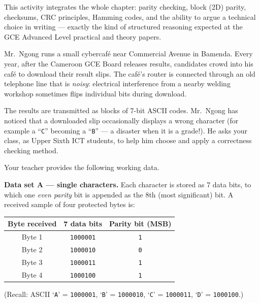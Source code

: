 \documentclass[11pt]{article}
\newcommand{\cle}[1]{{\popxbold\color{popdark}#1}}
\newcounter{popsec}
\newcounter{popsub}
\newcommand{\courssub}[1]{%
  \stepcounter{popsub}%
  \par\vspace{9pt}\noindent{\popxbold\fontsize{11.5}{13}\selectfont\color{popink}{\color{poporange}\thepopsec.\thepopsub}\hspace{6pt}#1}\par\nopagebreak\vspace{4pt}
}
\begin{document}
\begin{aretenir}
This activity integrates the whole chapter: parity checking, block (2D) parity, checksums, CRC principles, Hamming codes, and the ability to argue a technical choice in writing --- exactly the kind of structured reasoning expected at the GCE Advanced Level practical and theory papers.
\end{aretenir}

\courssub{Situation}

\begin{experience}
Mr.\ Ngong runs a small \cle{cybercafé} near Commercial Avenue in Bamenda. Every year, after the Cameroon GCE Board releases results, candidates crowd into his café to download their result slips. The café's router is connected through an old telephone line that is \emph{noisy}: electrical interference from a nearby welding workshop sometimes flips individual bits during download.

The results are transmitted as blocks of \cle{7-bit ASCII codes}. Mr.\ Ngong has noticed that a downloaded slip occasionally displays a wrong character (for example a ``\texttt{C}'' becoming a ``\texttt{B}'' --- a disaster when it is a grade!). He asks your class, as Upper Sixth ICT students, to help him choose and apply a \cle{correctness checking method}.

Your teacher provides the following working data.

\textbf{Data set A --- single characters.} Each character is stored as 7 data bits, to which one \emph{even parity} bit is appended as the 8th (most significant) bit. A received sample of four protected bytes is:

\begin{center}
\begin{tabular}{|c|c|c|}
\hline
\rowcolor{popblueL} Byte received & 7 data bits & Parity bit (MSB) \\
\hline
Byte 1 & \texttt{1000001} & \texttt{1} \\
\hline
Byte 2 & \texttt{1000010} & \texttt{0} \\
\hline
Byte 3 & \texttt{1000011} & \texttt{1} \\
\hline
Byte 4 & \texttt{1000100} & \texttt{1} \\
\hline
\end{tabular}
\end{center}

(Recall: ASCII `\texttt{A}' = \texttt{1000001}, `\texttt{B}' = \texttt{1000010}, `\texttt{C}' = \texttt{1000011}, `\texttt{D}' = \texttt{1000100}.)


\end{experience}
\end{document}
